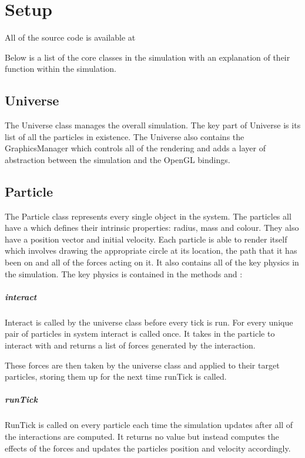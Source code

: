 \section{Setup}
	
	\sloppy
	All of the source code is available at 
	
	Below is a list of the core classes in the simulation with an explanation of their function within the simulation.
	
	\subsection{Universe}
		\fussy	
		The Universe class manages the overall simulation. The key part of Universe is its list of all the particles in existence. The Universe also contains the GraphicsManager which controls all of the rendering and adds a layer of abstraction between the simulation and the OpenGL bindings. 
		
	\subsection{Particle}
		
		The Particle class represents every single object in the system. The particles all have a  which defines their intrinsic properties: radius, mass and colour. They also have a position vector and initial velocity. Each particle is able to render itself which involves drawing the appropriate circle at its location, the path that it has been on and all of the forces acting on it. It also contains all of the key physics in the simulation.
		\linebreak\linebreak
		The key physics is contained in the methods  and :
		
		\subparagraph{interact}
		
			Interact is called by the universe class before every tick is run. For every unique pair of particles in system interact is called once. It takes in the particle to interact with and returns a list of forces generated by the interaction.
			
			These forces are then taken by the universe class and applied to their target particles, storing them up for the next time runTick is called.
		
		\subparagraph{runTick}
			
			RunTick is called on every particle each time the simulation updates after all of the interactions are computed. It returns no value but instead computes the effects of the forces and updates the particles position and velocity accordingly.
			
